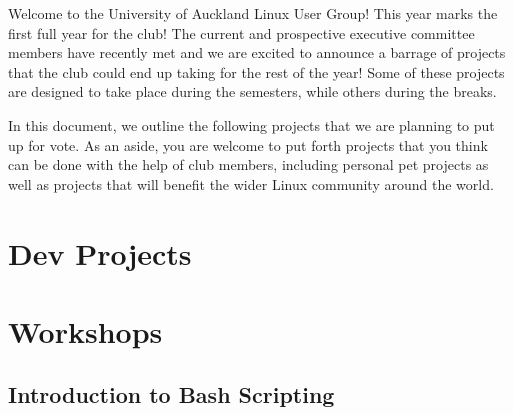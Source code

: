 \documentclass[11pt,fleqn]{article}
\begin{document}
\newpage

Welcome to the University of Auckland Linux User Group!  This year marks the first full year for the club!  The current and prospective executive committee members have recently met and we are excited to announce a barrage of projects that the club could end up taking for the rest of the year!  Some of these projects are designed to take place during the semesters, while others during the breaks.

In this document, we outline the following projects that we are planning to put up for vote.  As an aside, you are welcome to put forth projects that you think can be done with the help of club members, including personal pet projects as well as projects that will benefit the wider Linux community around the world.

\tableofcontents

\newpage

\section{Dev Projects}



\newpage



\newpage



\newpage



\newpage



\newpage



\newpage



\newpage

\section{Workshops}

\subsection{Introduction to Bash Scripting}
\end{document}
